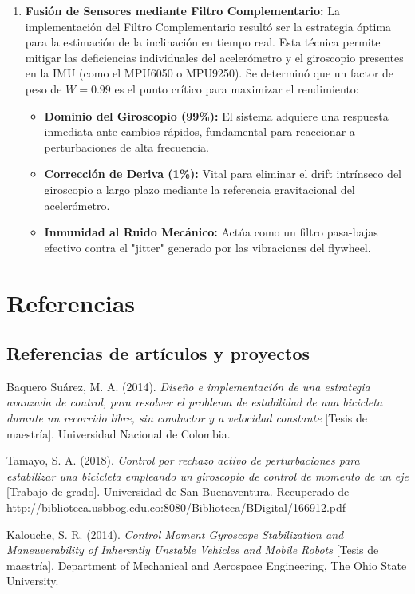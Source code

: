 \documentclass[12pt,letterpaper]{report}
\begin{document}
\begin{enumerate}
    \item \textbf{Fusión de Sensores mediante Filtro Complementario:} La implementación del Filtro Complementario resultó ser la estrategia óptima para la estimación de la inclinación en tiempo real. Esta técnica permite mitigar las deficiencias individuales del acelerómetro y el giroscopio presentes en la IMU (como el MPU6050 o MPU9250). Se determinó que un factor de peso de $W=0.99$ es el punto crítico para maximizar el rendimiento:
    \begin{itemize}
        \item \textbf{Dominio del Giroscopio (99\%):} El sistema adquiere una respuesta inmediata ante cambios rápidos, fundamental para reaccionar a perturbaciones de alta frecuencia.
        \item \textbf{Corrección de Deriva (1\%):} Vital para eliminar el drift intrínseco del giroscopio a largo plazo mediante la referencia gravitacional del acelerómetro.
        \item \textbf{Inmunidad al Ruido Mecánico:} Actúa como un filtro pasa-bajas efectivo contra el "jitter" generado por las vibraciones del flywheel.
    \end{itemize}
\end{enumerate}

\chapter{Referencias}

\section*{Referencias de artículos y proyectos}

Baquero Suárez, M. A. (2014). \textit{Diseño e implementación de una estrategia avanzada de control, para resolver el problema de estabilidad de una bicicleta durante un recorrido libre, sin conductor y a velocidad constante} [Tesis de maestría]. Universidad Nacional de Colombia.

Tamayo, S. A. (2018). \textit{Control por rechazo activo de perturbaciones para estabilizar una bicicleta empleando un giroscopio de control de momento de un eje} [Trabajo de grado]. Universidad de San Buenaventura. Recuperado de http://biblioteca.usbbog.edu.co:8080/Biblioteca/BDigital/166912.pdf

Kalouche, S. R. (2014). \textit{Control Moment Gyroscope Stabilization and Maneuverability of Inherently Unstable Vehicles and Mobile Robots} [Tesis de maestría]. Department of Mechanical and Aerospace Engineering, The Ohio State University.
\end{document}
